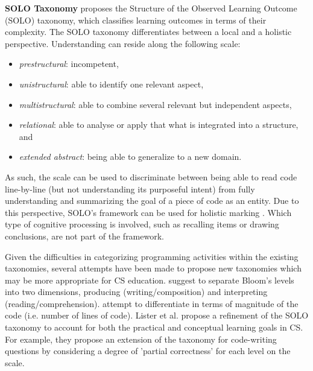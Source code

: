 \noindent \textbf{SOLO Taxonomy}\newline
{} proposes the Structure of the Observed Learning Outcome (SOLO) taxonomy, which classifies learning outcomes in terms of their complexity. The SOLO taxonomy differentiates between a local and a holistic perspective. Understanding can reside along the following scale:
\begin{itemize}
\item \emph{prestructural}: incompetent,
\item \emph{unistructural}: able to identify one relevant aspect,
\item \emph{multistructural}: able to combine several relevant but independent aspects,
\item \emph{relational}: able to analyse or apply that what is integrated into a structure, and
\item \emph{extended abstract}: being able to generalize to a new domain.
\end{itemize}
 As such, the scale can be used to discriminate between being able to read code line-by-line (but not understanding its purposeful intent) from fully understanding and summarizing the goal of a piece of code as an entity. Due to this perspective, SOLO's framework can be used for holistic marking \cite{Fuller2007}. Which type of cognitive processing is involved, such as recalling items or drawing conclusions, are not part of the framework.





Given the difficulties in categorizing programming activities within the existing taxonomies, several attempts have been made to propose new taxonomies which may be more appropriate for CS education.  suggest to separate Bloom’s levels into two dimensions, producing (writing/composition) and interpreting (reading/comprehension).  attempt to differentiate in terms of magnitude of the code (i.e. number of lines of code). Lister et al. \cite{lister2010naturally} propose a refinement of the SOLO taxonomy to account for both the practical and conceptual learning goals in CS. For example, they propose an extension of the taxonomy for code-writing questions by considering a degree of 'partial correctness' for each level on the scale.


